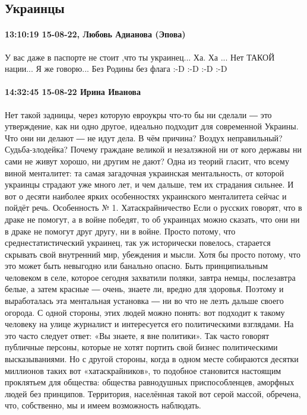  
 
 
 
 

\subsection{Украинцы}

\paragraph{13:10:19 15-08-22, Любовь Адианова (Эпова)}

У вас даже в паспорте не стоит ,что ты украинец...
Ха. Ха ...
Нет ТАКОЙ нации...
Я же говорю...
Без Родины без флага
:-D :-D :-D :-D

\paragraph{14:32:45 15-08-22 Ирина Иванова}

Нет такой задницы, через которую евроукры что-то бы ни сделали ― это
утверждение, как ни одно другое, идеально подходит для современной Украины. Что
они ни делают ― не идут дела. В чём причина? Воздух неправильный?
Судьба-злодейка? Почему граждане великой и незалэжной ни от кого державы ни
сами не живут хорошо, ни другим не дают? Одна из теорий гласит, что всему виной
менталитет: та самая загадочная украинская ментальность, от которой украинцы
страдают уже много лет, и чем дальше, тем их страдания сильнее. И вот о десяти
наиболее ярких особенностях украинского менталитета сейчас и пойдёт
речь. Особенность № 1. Хатаскрайничество Если о русских говорят, что в драке
не помогут, а в войне победят, то об украинцах можно сказать, что они ни в
драке не помогут друг другу, ни в войне. Просто потому, что
среднестатистический украинец, так уж исторически повелось, старается скрывать
свой внутренний мир, убеждения и мысли. Хотя бы просто потому, что это может
быть невыгодно или банально опасно. Быть принципиальным человеком в селе,
которое сегодня захватили поляки, завтра немцы, послезавтра белые, а затем
красные ― очень, знаете ли, вредно для здоровья. Поэтому и выработалась эта
ментальная установка ― ни во что не лезть дальше своего огорода. С одной
стороны, этих людей можно понять: вот подходит к такому человеку на улице
журналист и интересуется его политическими взглядами. На это часто следует
ответ: «Вы знаете, я вне политики». Так часто говорят публичные персоны,
которые не хотят портить свой бизнес политическими высказываниями. Но с другой
стороны, когда в одном месте собираются десятки миллионов таких вот
«хатаскрайников», то подобное становится настоящим проклятьем для общества:
общества равнодушных приспособленцев, аморфных людей без принципов. Территория,
населённая такой вот серой массой, обречена, что, собственно, мы и имеем
возможность наблюдать.

